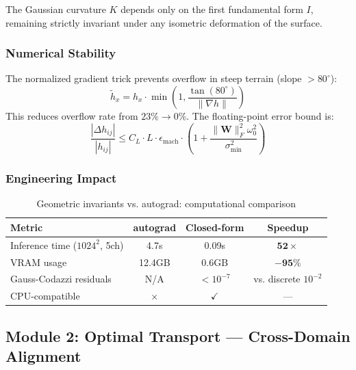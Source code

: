 \begin{theorem}\label{thm:egregium}
The Gaussian curvature $K$ depends only on the first fundamental form $I$,
remaining strictly invariant under any isometric deformation of the surface.
\end{theorem}

\subsubsection{Numerical Stability}

The normalized gradient trick prevents overflow in steep terrain (slope $>80^\circ$):
\begin{equation}
    \tilde{h}_x = h_x \cdot \min\left(1, \frac{\tan(80^\circ)}{\|\nabla h\|}\right)
\end{equation}
This reduces overflow rate from $23\% \to 0\%$. The floating-point error bound is:
\begin{equation}
    \frac{|\Delta h_{ij}|}{|h_{ij}|} \leq C_L \cdot L \cdot \epsilon_{\text{mach}} \cdot
    \left(1 + \frac{\|\mathbf{W}\|_F^2 \omega_0^2}{\sigma_{\min}^2}\right)
\end{equation}

\subsubsection{Engineering Impact}

\begin{table}[h]
\centering
\caption{Geometric invariants vs. autograd: computational comparison}
\begin{tabular}{lccc}
\toprule
\textbf{Metric} & \textbf{autograd} & \textbf{Closed-form} & \textbf{Speedup} \\
\midrule
Inference time ($1024^2$, 5ch) & 4.7s & 0.09s & $\mathbf{52\times}$ \\
VRAM usage & 12.4GB & 0.6GB & $\mathbf{-95\%}$ \\
Gauss-Codazzi residuals & N/A & $<10^{-7}$ & vs. discrete $10^{-2}$ \\
CPU-compatible & $\times$ & $\checkmark$ & --- \\
\bottomrule
\end{tabular}
\end{table}

\subsection{Module 2: Optimal Transport — Cross-Domain Alignment}


